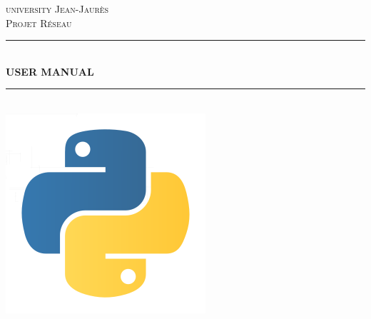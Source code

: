 \documentclass[12pt]{article}
\begin{document}
\newcommand{\HRule}{\rule{\linewidth}{0.5mm}} %

\center %
 

\textsc{\LARGE university Jean-Jaur\`{e}s}\\[1.5cm] %
\textsc{\large Projet Réseau }\\[0.5cm] %



\HRule \\[0.4cm]
{ \huge \bfseries USER MANUAL}\\[0.4cm] %
\HRule \\[1.5cm]

\includegraphics[scale=0.25]{logo.png}\\[1cm] %
 

\end{document}
